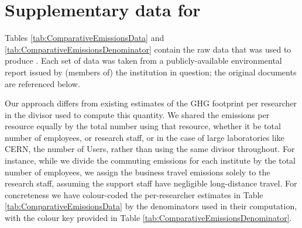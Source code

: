 \documentclass[../SustainableHEP.tex]{subfiles}
\begin{document}
\RaggedRight
\sloppy
\clearpage
\section{Supplementary data for }
\label{sec:DataforFig1.4}

Tables \ref{tab:ComparativeEmissionsData} and \ref{tab:ComparativeEmissionsDenominator} contain the raw data that was used to produce .  Each set of data was taken from a publicly-available environmental report issued by (members of) the institution in question; the original documents are referenced below.

Our approach differs from existing estimates of the GHG footprint per researcher in the divisor used to compute this quantity.  We shared the emissions per resource equally by the total number using that resource, whether it be total number of employees, or research staff, or in the case of large laboratories like CERN, the number of Users, rather than using the same divisor throughout.  For instance, while we divide the commuting emissions for each institute by the total number of employees, we assign the business travel emissions solely to the research staff, assuming the support staff have negligible long-distance travel.  For concreteness we have colour-coded the per-researcher estimates in Table \ref{tab:ComparativeEmissionsData} by the denominators used in their computation, with the colour key provided in Table \ref{tab:ComparativeEmissionsDenominator}. 
\end{document}
